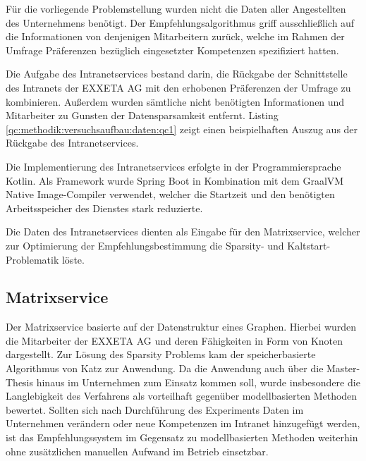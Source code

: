 Für die vorliegende Problemstellung wurden nicht die Daten aller Angestellten des Unternehmens benötigt. Der Empfehlungsalgorithmus griff ausschließlich auf die Informationen von denjenigen Mitarbeitern zurück, welche im Rahmen der Umfrage Präferenzen bezüglich eingesetzter Kompetenzen spezifiziert hatten.

Die Aufgabe des Intranetservices bestand darin, die Rückgabe der Schnittstelle des Intranets der EXXETA AG mit den erhobenen Präferenzen der Umfrage zu kombinieren. Außerdem wurden sämtliche nicht benötigten Informationen und Mitarbeiter zu Gunsten der Datensparsamkeit entfernt. Listing \ref{qc:methodik:versuchsaufbau:daten:qc1} zeigt einen beispielhaften Auszug aus der Rückgabe des Intranetservices.



Die Implementierung des Intranetservices erfolgte in der Programmiersprache Kotlin. Als Framework wurde Spring Boot in Kombination mit dem GraalVM Native Image-Compiler verwendet, welcher die Startzeit und den benötigten Arbeitsspeicher des Dienstes stark reduzierte.

Die Daten des Intranetservices dienten als Eingabe für den Matrixservice, welcher zur Optimierung der Empfehlungsbestimmung die Sparsity- und Kaltstart-Problematik löste.

\subsection{Matrixservice}
\label{ch:methodik:versuchsaufbau:systemarchitektur:matrixservice}
Der Matrixservice basierte auf der Datenstruktur eines Graphen. Hierbei wurden die Mitarbeiter der EXXETA AG und deren Fähigkeiten in Form von Knoten dargestellt. Zur Lösung des Sparsity Problems kam der speicherbasierte Algorithmus von Katz zur Anwendung. Da die Anwendung auch über die Master-Thesis hinaus im Unternehmen zum Einsatz kommen soll, wurde insbesondere die Langlebigkeit des Verfahrens als vorteilhaft gegenüber modellbasierten Methoden bewertet. Sollten sich nach Durchführung des Experiments Daten im Unternehmen verändern oder neue Kompetenzen im Intranet hinzugefügt werden, ist das Empfehlungssystem im Gegensatz zu modellbasierten Methoden weiterhin ohne zusätzlichen manuellen Aufwand im Betrieb einsetzbar.

